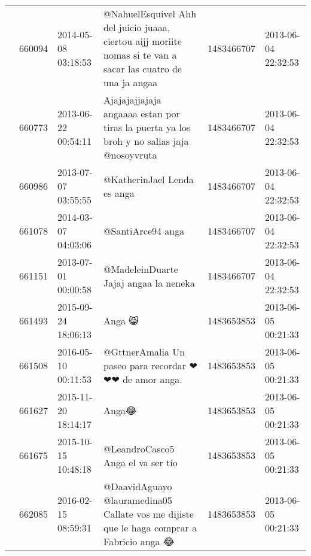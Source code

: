 \begin{tabular}{llllrl}
           & 660094  & 2014-05-08 03:18:53 &                                @NahuelEsquivel Ahh del juicio juaaa, ciertou aijj moriite nomas si te van a sacar las cuatro de una ja angaa &  1483466707 & 2013-06-04 22:32:53 \\
           & 660773  & 2013-06-22 00:54:11 &                                                    Ajajajajjajaja angaaaa estan por tiras la puerta ya los broh y no salias jaja @nosoyvruta &  1483466707 & 2013-06-04 22:32:53 \\
           & 660986  & 2013-07-07 03:55:55 &                                                                                                                  @KatherinJael Lenda es anga &  1483466707 & 2013-06-04 22:32:53 \\
           & 661078  & 2014-03-07 04:03:06 &                                                                                                                            @SantiArce94 anga &  1483466707 & 2013-06-04 22:32:53 \\
           & 661151  & 2013-07-01 00:00:58 &                                                                                                        @MadeleinDuarte Jajaj angaa la neneka &  1483466707 & 2013-06-04 22:32:53 \\
           & 661493  & 2015-09-24 18:06:13 &                                                                                                                                       Anga 😸 &  1483653853 & 2013-06-05 00:21:33 \\
           & 661508  & 2016-05-10 00:11:53 &                                                                                       @GttnerAmalia Un paseo para recordar ❤❤❤ de amor anga. &  1483653853 & 2013-06-05 00:21:33 \\
           & 661627  & 2015-11-20 18:14:17 &                                                                                                                                        Anga😂 &  1483653853 & 2013-06-05 00:21:33 \\
           & 661675  & 2015-10-15 10:48:18 &                                                                                                         @LeandroCasco5 Anga el va ser tío 👏😄 &  1483653853 & 2013-06-05 00:21:33 \\
           & 662085  & 2016-02-15 08:59:31 &                                                    @DaavidAguayo @lauramedina05 Callate vos me dijiste que le haga comprar a Fabricio anga 😂 &  1483653853 & 2013-06-05 00:21:33 \\

\end{tabular}
